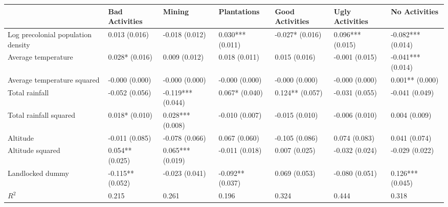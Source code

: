 \begin{tabular}{lllllll}
\toprule
 & Bad Activities & Mining & Plantations & Good Activities & Ugly Activities & No Activities \\
\midrule
Log precolonial population density & 0.013
(0.016) & -0.018
(0.012) & 0.030***
(0.011) & -0.027*
(0.016) & 0.096***
(0.015) & -0.082***
(0.014) \\
Average temperature & 0.028*
(0.016) & 0.009
(0.012) & 0.018
(0.011) & 0.015
(0.016) & -0.001
(0.015) & -0.041***
(0.014) \\
Average temperature squared & -0.000
(0.000) & -0.000
(0.000) & -0.000
(0.000) & -0.000
(0.000) & -0.000
(0.000) & 0.001**
(0.000) \\
Total rainfall & -0.052
(0.056) & -0.119***
(0.044) & 0.067*
(0.040) & 0.124**
(0.057) & -0.031
(0.055) & -0.041
(0.049) \\
Total rainfall squared & 0.018*
(0.010) & 0.028***
(0.008) & -0.010
(0.007) & -0.015
(0.010) & -0.006
(0.010) & 0.004
(0.009) \\
Altitude & -0.011
(0.085) & -0.078
(0.066) & 0.067
(0.060) & -0.105
(0.086) & 0.074
(0.083) & 0.041
(0.074) \\
Altitude squared & 0.054**
(0.025) & 0.065***
(0.019) & -0.011
(0.018) & 0.007
(0.025) & -0.032
(0.024) & -0.029
(0.022) \\
Landlocked dummy & -0.115**
(0.052) & -0.023
(0.041) & -0.092**
(0.037) & 0.069
(0.053) & -0.080
(0.051) & 0.126***
(0.045) \\
$R^2$ & 0.215 & 0.261 & 0.196 & 0.324 & 0.444 & 0.318 \\
\bottomrule
\end{tabular}
